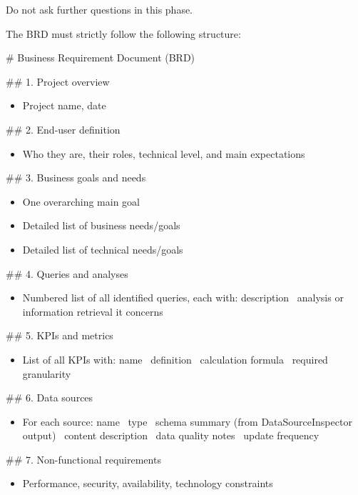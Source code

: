 Do not ask further questions in this phase.
\newline

The BRD must strictly follow the following structure:
\newline

\# Business Requirement Document (BRD)
\newline

\#\# 1. Project overview
\begin{itemize}
    \item Project name, date
\end{itemize}

\#\# 2. End-user definition
\begin{itemize}
    \item Who they are, their roles, technical level, and main expectations
\end{itemize}

\#\# 3. Business goals and needs
\begin{itemize}
    \item One overarching main goal
    \item Detailed list of business needs/goals
    \item Detailed list of technical needs/goals
\end{itemize}

\#\# 4. Queries and analyses
\begin{itemize}
    \item Numbered list of all identified queries, each with: description \textbar\  analysis or information retrieval it concerns
\end{itemize}

\#\# 5. KPIs and metrics
\begin{itemize}
    \item List of all KPIs with: name \textbar\  definition \textbar\  calculation formula \textbar\  required granularity
\end{itemize}

\#\# 6. Data sources
\begin{itemize}
    \item For each source: name \textbar\  type \textbar\  schema summary (from DataSourceInspector output) \textbar\  content description \textbar\  data quality notes \textbar\  update frequency
\end{itemize}

\#\# 7. Non-functional requirements
\begin{itemize}
    \item Performance, security, availability, technology constraints
\end{itemize}

